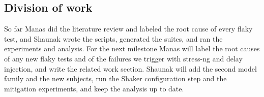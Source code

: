 \documentclass[sigconf,nonacm]{acmart}
\begin{document}
\subsection*{Division of work}
So far Manas did the literature review and labeled the root cause of every flaky test, and Shaunak wrote the scripts, generated the suites, and ran the experiments and analysis. For the next milestone Manas will label the root causes of any new flaky tests and of the failures we trigger with stress-ng and delay injection, and write the related work section. Shaunak will add the second model family and the new subjects, run the Shaker configuration step and the mitigation experiments, and keep the analysis up to date.



\end{document}
